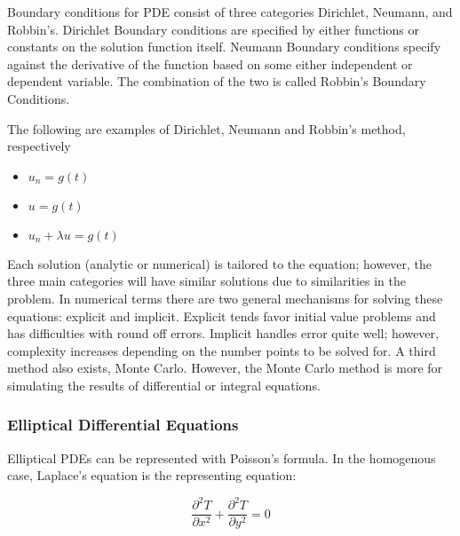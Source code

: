 Boundary conditions for %
PDE%
 consist of three categories %
 Dirichlet, Neumann, and Robbin's.  Dirichlet Boundary conditions are specified by either functions or constants on the solution function itself.  Neumann Boundary conditions specify against the derivative of the function based on some either independent or dependent variable.  The combination of the two is called Robbin's Boundary Conditions.  %

The following are examples of Dirichlet, Neumann and Robbin's method, respectively%
\begin{itemize}
\item $u_n =g(t) $
\item $u = g(t) $
\item $u_n + \lambda u = g(t)$
\end{itemize}



Each solution (analytic or numerical) is tailored to the equation; however, the three main categories will have similar solutions due to similarities in the problem. 
In numerical terms there are two general mechanisms for solving these equations: explicit and implicit.  Explicit tends favor initial value problems and has difficulties with round off errors.  Implicit handles error quite well; however, complexity %
 increases depending on the number points to be solved for.  A third method also exists, Monte Carlo.  However, the Monte Carlo method is more for simulating the results of differential or integral equations.  




\subsubsection {Elliptical Differential Equations} 
Elliptical PDEs can be represented with Poisson's formula.  In the homogenous case, Laplace's equation is the representing equation:

\begin{equation}
\frac{\partial ^2 T} {\partial x^2} + \frac{\partial ^2 T} {\partial y^2} = 0
\end{equation}


